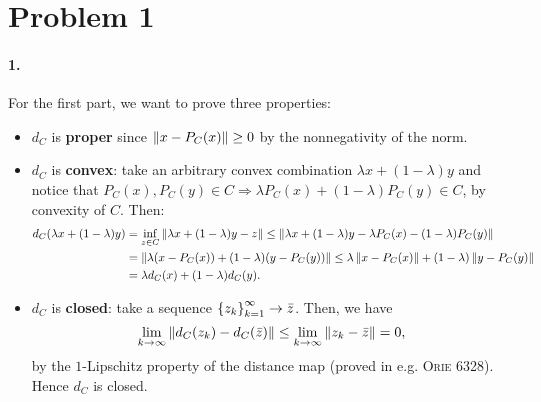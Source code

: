 \documentclass[10pt]{article}
\begin{document}
\allowdisplaybreaks
\everymath{\displaystyle}


\section*{Problem 1}
\paragraph{1.}
For the first part, we want to prove three properties:
\begin{itemize}
\item $d_{C}$ is \textbf{proper} since $\left \| x - P_C(x) \right \| \geq 0$ by the
nonnegativity of the norm.
\item $d_{C}$ is \textbf{convex}: take an arbitrary convex combination $
\lambda x + (1 - \lambda) y$ and notice that $P_C(x), P_C(y) \in C \Rightarrow
\lambda P_C(x) + (1 - \lambda) P_C(y) \in C$, by convexity of $C$. Then:
\begin{align*}
    d_C(\lambda x + (1 - \lambda)y) &= \inf_{z \in C}
    \left \| \lambda x + (1 - \lambda) y - z \right \| \leq
    \left \| \lambda x + (1 - \lambda) y - \lambda P_C(x) - (1 - \lambda) P_C(y) \right \|
    \\
    &= \left \| \lambda(x  - P_C(x)) + (1 - \lambda)(y - P_C(y)) \right \| \leq
       \lambda \left \| x - P_C(x) \right \| + (1 - \lambda) \left \| y - P_C(y) \right \| \\
    &=   \lambda d_C(x) + (1 - \lambda) d_C(y).
\end{align*}
\item $d_C$ is \textbf{closed}: take a sequence
$\left\{ z_k \right\}_{k=1}^{\infty} \to \bar{z}$. Then, we have
\[
    \lim_{k \to \infty} \left \| d_C(z_k) - d_C(\bar{z}) \right \| \leq
    \lim_{k \to \infty} \left \| z_k - \bar{z} \right \| = 0,
\]
by the $1$-Lipschitz property of the distance map (proved in e.g. \textsc{Orie
6328}). Hence $d_C$ is closed.
\end{itemize}
\end{document}
